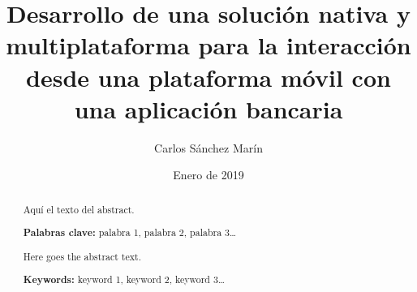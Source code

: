\documentclass[a4paper, 12pt]{article}
\author{Carlos Sánchez Marín}
\date{Enero de 2019}
\title{Desarrollo de una solución nativa y multiplataforma para la interacción desde una plataforma móvil con una aplicación bancaria}
\begin{document}
\maketitle
\begin{export}
\null
\newpage

\tableofcontents
\newpage

\listoffigures
\listoftables
\listoflistings
\newpage
\end{export}

\begin{abstract}
\normalsize
Aquí el texto del abstract.

\textbf{Palabras clave:} palabra 1, palabra 2, palabra 3\ldots{}
\end{abstract}

\begin{otherlanguage}{english}
\begin{abstract}
\normalsize
Here goes the abstract text.

\textbf{Keywords:} keyword 1, keyword 2, keyword 3\ldots
\end{abstract}
\end{otherlanguage}

\newpage
{}%
\end{document}
